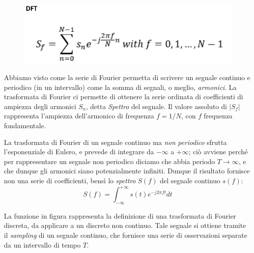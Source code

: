\begin{figure}[htbp]
   \centering
   \includegraphics{images/questions/Schermata del 2023-11-04 16-30-36.png}
   \label{fig:dom2.16}
\end{figure}

Abbiamo visto come la serie di Fourier permetta di scrivere un segnale continuo e periodico (in un intervallo) come la somma di segnali, o meglio, \textit{armonici}.
La trasformata di Fourier ci permette di ottenere la serie ordinata di coefficienti di ampiezza degli armonici $S_n$, detta \textit{Spettro} del segnale.
Il valore assoluto di $|S_f|$ rappresenta l'ampiezza dell'armonico di frequenza $f=1/N$, con $f$ frequenza fondamentale.


La trasformata di Fourier di un segnale continuo ma \textit{non periodico} sfrutta l'esponenziale di Eulero, e prevede di integrare da $-\infty$ a $+\infty$; ciò avviene perché per rappresentare un segnale non periodico diciamo che abbia periodo $T\rightarrow\infty$, e che dunque gli armonici siano potenzialmente infiniti. Dunque il risultato fornisce non una serie di coefficienti, bensì lo \textit{spettro} $S(f)$ del segnale continuo $s(f)$:
\begin{equation}
\label{eq:FT_periodic}
S(f) = \int_{-\infty}^{+\infty}s(t) e^{- j 2 \pi f t}dt
\end{equation}

La funzione in figura rappresenta la definizione di una trasformata di Fourier discreta, da applicare a un discreto non continuo.
Tale segnale si ottiene tramite il \textit{sampling} di un segnale continuo, che fornisce una serie di osservazioni separate da un intervallo di tempo $T$.

